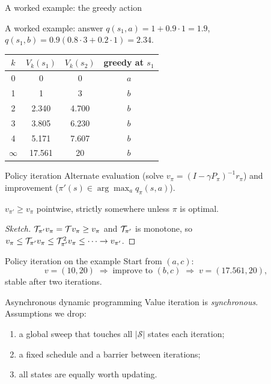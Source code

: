 \begin{frame}{A worked example: the greedy action}
\end{frame}

\begin{frame}{A worked example: answer}
	$q(s_1,a)=1+0.9\cdot1=1.9$, \quad $q(s_1,b)=0.9(0.8\cdot3+0.2\cdot1)=2.34$.

	\centering
	\renewcommand{\arraystretch}{1.1}
	\begin{tabular}{@{}cccc@{}}
		\toprule
		$k$ & $V_k(s_1)$ & $V_k(s_2)$ & greedy at $s_1$\\
		\midrule
		0 & 0 & 0 & $a$\\
		1 & 1 & 3 & \alert{$b$}\\
		2 & 2.340 & 4.700 & $b$\\
		3 & 3.805 & 6.230 & $b$\\
		4 & 5.171 & 7.607 & $b$\\
		$\infty$ & 17.561 & 20 & $b$\\
		\bottomrule
	\end{tabular}
\end{frame}

\begin{frame}{Policy iteration}
	Alternate \alert{evaluation} (solve $v_\pi=(I-\gamma P_\pi)^{-1}r_\pi$) and \alert{improvement}
	($\pi'(s)\in\arg\max_a q_\pi(s,a)$).

	\begin{theorem}
		$v_{\pi'}\ge v_\pi$ pointwise, strictly somewhere unless $\pi$ is optimal.
	\end{theorem}
	\begin{proof}[Sketch]
		$\mathcal{T}_{\pi'}v_\pi=\mathcal{T} v_\pi\ge v_\pi$ and $\mathcal{T}_{\pi'}$ is monotone, so
		$v_\pi\le\mathcal{T}_{\pi'}v_\pi\le\mathcal{T}_{\pi'}^2v_\pi\le\dots\to v_{\pi'}$.
	\end{proof}
\end{frame}

\begin{frame}{Policy iteration on the example}
	Start from $(a,c)$:
	\[
		v=(10,20)\;\Rightarrow\;\text{improve to }(b,c)\;\Rightarrow\;v=(17.561,20),
	\]
	stable after \alert{two} iterations.
\end{frame}

\begin{frame}{Asynchronous dynamic programming}
	Value iteration is \emph{synchronous}. Assumptions we drop:
	\begin{enumerate}
		\item a \alert{global sweep} that touches all $|\mathcal S|$ states each iteration;
		\item a \alert{fixed schedule} and a barrier between iterations;
		\item all states are equally worth updating.
	\end{enumerate}
\end{frame}

